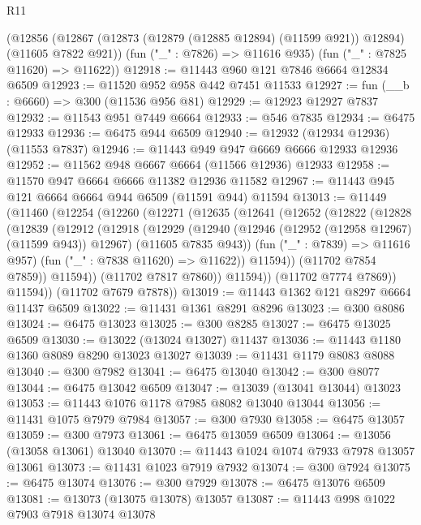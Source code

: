 \begin{lexlean}{R11}
\begin{coremodule}
    (@12856
      (@12867 (@12873 (@12879 (@12885 @12894) (@11599 @921)) @12894) (@11605 @7822 @921))
      (fun ("_" : @7826) => @11616 @935)
      (fun ("_" : @7825 @11620) => @11622))
@12918 := @11443 @960 @121 @7846 @6664 @12834 @6509
@12923 := @11520 @952 @958 @442 @7451 @11533
@12927 := fun (__b : @6660) => @300 (@11536 @956 @81)
@12929 := @12923 @12927 @7837
@12932 := @11543 @951 @7449 @6664
@12933 := @546 @7835
@12934 := @6475 @12933
@12936 := @6475 @944 @6509
@12940 := @12932 (@12934 @12936) (@11553 @7837)
@12946 := @11443 @949 @947 @6669 @6666 @12933 @12936
@12952 := @11562 @948 @6667 @6664 (@11566 @12936) @12933
@12958 := @11570 @947 @6664 @6666 @11382 @12936 @11582
@12967 := @11443 @945 @121 @6664 @6664 @944 @6509 (@11591 @944) @11594
@13013 := @11449
    (@11460
      (@12254
        (@12260
          (@12271
            (@12635
              (@12641
                (@12652
                  (@12822
                    (@12828
                      (@12839
                        (@12912
                          (@12918
                            (@12929
                              (@12940
                                (@12946 (@12952 (@12958 @12967) (@11599 @943)) @12967)
                                (@11605 @7835 @943))
                              (fun ("_" : @7839) => @11616 @957)
                              (fun ("_" : @7838 @11620) => @11622))
                            @11594))
                        (@11702 @7854 @7859))
                      @11594))
                  (@11702 @7817 @7860))
                @11594))
            (@11702 @7774 @7869))
          @11594))
      (@11702 @7679 @7878))
@13019 := @11443 @1362 @121 @8297 @6664 @11437 @6509
@13022 := @11431 @1361 @8291 @8296
@13023 := @300 @8086
@13024 := @6475 @13023
@13025 := @300 @8285
@13027 := @6475 @13025 @6509
@13030 := @13022 (@13024 @13027) @11437
@13036 := @11443 @1180 @1360 @8089 @8290 @13023 @13027
@13039 := @11431 @1179 @8083 @8088
@13040 := @300 @7982
@13041 := @6475 @13040
@13042 := @300 @8077
@13044 := @6475 @13042 @6509
@13047 := @13039 (@13041 @13044) @13023
@13053 := @11443 @1076 @1178 @7985 @8082 @13040 @13044
@13056 := @11431 @1075 @7979 @7984
@13057 := @300 @7930
@13058 := @6475 @13057
@13059 := @300 @7973
@13061 := @6475 @13059 @6509
@13064 := @13056 (@13058 @13061) @13040
@13070 := @11443 @1024 @1074 @7933 @7978 @13057 @13061
@13073 := @11431 @1023 @7919 @7932
@13074 := @300 @7924
@13075 := @6475 @13074
@13076 := @300 @7929
@13078 := @6475 @13076 @6509
@13081 := @13073 (@13075 @13078) @13057
@13087 := @11443 @998 @1022 @7903 @7918 @13074 @13078

\end{coremodule}
\end{lexlean}
